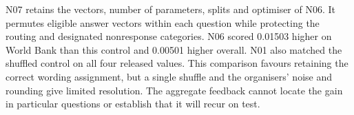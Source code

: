 \documentclass{article}
\begin{document}
N07 retains the vectors, number of parameters, splits and optimiser of N06. It permutes eligible answer vectors within each question while protecting the routing and designated nonresponse categories. N06 scored 0.01503 higher on World Bank than this control and 0.00501 higher overall. N01 also matched the shuffled control on all four released values. This comparison favours retaining the correct wording assignment, but a single shuffle and the organisers' noise and rounding give limited resolution. The aggregate feedback cannot locate the gain in particular questions or establish that it will recur on test.
\end{document}
